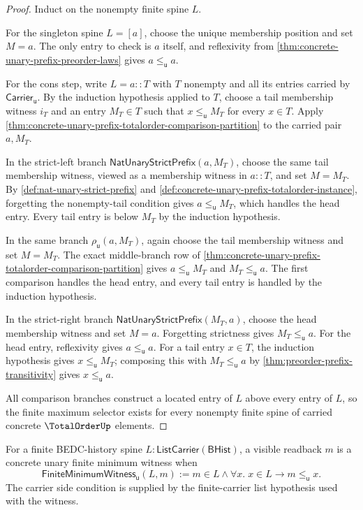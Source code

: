 \begin{proof}
Induct on the nonempty finite spine $L$.

For the singleton spine $L=[a]$, choose the unique membership position and set
$M=a$. The only entry to check is $a$ itself, and reflexivity from
\autoref{thm:concrete-unary-prefix-preorder-laws} gives $a\le_{\mathsf{u}}a$.

For the cons step, write $L=a::T$ with $T$ nonempty and all its entries carried
by $\mathsf{Carrier}_{\mathsf{u}}$. By the induction hypothesis applied to
$T$, choose a tail membership witness $i_T$ and an entry $M_T\in T$ such that
$x\le_{\mathsf{u}}M_T$ for every $x\in T$. Apply
\autoref{thm:concrete-unary-prefix-totalorder-comparison-partition} to the
carried pair $a,M_T$.

In the strict-left branch $\mathsf{NatUnaryStrictPrefix}(a,M_T)$, choose the
same tail membership witness, viewed as a membership witness in $a::T$, and set
$M=M_T$. By \autoref{def:nat-unary-strict-prefix} and
\autoref{def:concrete-unary-prefix-totalorder-instance}, forgetting the
nonempty-tail condition gives $a\le_{\mathsf{u}}M_T$, which handles the head
entry. Every tail entry is below $M_T$ by the induction hypothesis.

In the same branch $\rho_{\mathsf{u}}(a,M_T)$, again choose the tail membership
witness and set $M=M_T$. The exact middle-branch row of
\autoref{thm:concrete-unary-prefix-totalorder-comparison-partition} gives
$a\le_{\mathsf{u}}M_T$ and $M_T\le_{\mathsf{u}}a$. The first comparison handles
the head entry, and every tail entry is handled by the induction hypothesis.

In the strict-right branch $\mathsf{NatUnaryStrictPrefix}(M_T,a)$, choose the
head membership witness and set $M=a$. Forgetting strictness gives
$M_T\le_{\mathsf{u}}a$. For the head entry, reflexivity gives
$a\le_{\mathsf{u}}a$. For a tail entry $x\in T$, the induction hypothesis gives
$x\le_{\mathsf{u}}M_T$; composing this with $M_T\le_{\mathsf{u}}a$ by
\autoref{thm:preorder-prefix-transitivity} gives $x\le_{\mathsf{u}}a$.

All comparison branches construct a located entry of $L$ above every entry of
$L$, so the finite maximum selector exists for every nonempty finite spine of
carried concrete $\TotalOrderUp$ elements.
\end{proof}

\begin{definition}
\label{def:totalorder-prefix-finite-minimum-witness}
For a finite BEDC-history spine $L:\mathsf{ListCarrier}(\mathsf{BHist})$, a visible readback $m$ is a concrete unary finite minimum witness when
$$
\mathsf{FiniteMinimumWitness}_{\mathsf{u}}(L,m)
:=
m\in L
\land
\forall x.\; x\in L\to m\le_{\mathsf{u}}x.
$$
The carrier side condition is supplied by the finite-carrier list hypothesis used with the witness.
\end{definition}

